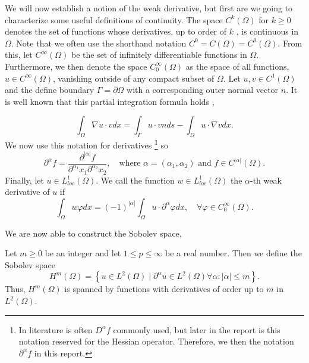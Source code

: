 We will now establish a notion of the weak derivative, but first are we going to characterize some useful definitions of continuity. The space $C^{k}\left( \Omega  \right) $ for $k\ge 0$ denotes the set of functions whose derivatives, up to order of
$k$ , is continuous in $\Omega $. Note that we often use the shorthand notation $ C^{0} = C\left( \Omega  \right)  = C^{0}\left( \Omega  \right) $.
From this, let $C^{\infty}\left( \Omega  \right) $ be the set of infinitely differentiable functions in $\Omega $. Furthermore, we then denote the space $C^{\infty}_{0}\left( \Omega  \right)$ as the space of all functions, $u \in C^{\infty}\left( \Omega
\right) $, vanishing outside of any compact subset of $\Omega $. Let $u,v \in  C^{1}\left( \Omega  \right) $ and the define boundary $\Gamma  = \partial \Omega $ with a corresponding outer normal vector $n$. It is well known that this partial
integration formula holds \cite{manzoni2021optimal},

\[
\int_{\Omega }^{} \nabla u \cdot v dx = \int_{\Gamma }^{} u\cdot v n ds - \int_{\Omega }^{} u \cdot \nabla v dx.
\]
We now use this notation for derivatives
\footnote{In literature is often $D^{\alpha } f$ commonly used, but later in the report is this notation reserved for the Hessian operator. Therefore, we then the notation $\partial ^{\alpha } f$ in this report.} so
\begin{equation}
\label{eq:mixed_derivative}
\partial ^{\alpha  } f = \frac{\partial ^{\left\lvert \alpha  \right\rvert } f}{ \partial ^{\alpha _{1} } x_{1} \partial ^{\alpha _{2}} x_{2}  }, \quad \text{where } \alpha=\left( \alpha _{1}, \alpha _{2} \right) \text{ and } f \in C^{\left\lvert \alpha  \right\rvert }
\left( \Omega  \right)
.\end{equation}
Finally, let $u \in  L^{1}_{loc}\left( \Omega  \right) $. We call the function $w \in L_{loc}^{1}\left( \Omega  \right) $ the $\alpha $-th weak derivative of $u$  if \[
\int_{\Omega }^{} w \varphi  dx = \left( -1 \right) ^{\left\lvert \alpha  \right\rvert } \int_{\Omega }^{} u \cdot \partial ^{\alpha } \varphi dx, \quad \forall \varphi \in  C_{0}^{\infty}\left( \Omega  \right).
\]

We are now able to construct the Sobolev space,

\begin{definition}
    \label{def:sobolev_spaces}
    Let $m\ge 0$ be an integer and let $1 \le  p \le  \infty$ be a real number. Then we define the Sobolev space
\[
H^{m}\left( \Omega  \right) = \left\{ u \in L^{2}\left( \Omega  \right)  \mid  \partial ^{\alpha } u \in L^{2}\left( \Omega  \right)  \forall \alpha : \left\lvert \alpha  \right\rvert  \le m \right\}.
\]
Thus, $H^{m}( \Omega ) $ is spanned by functions with derivatives of order up to $m$ in $L^{2}( \Omega ) $.
\end{definition}

